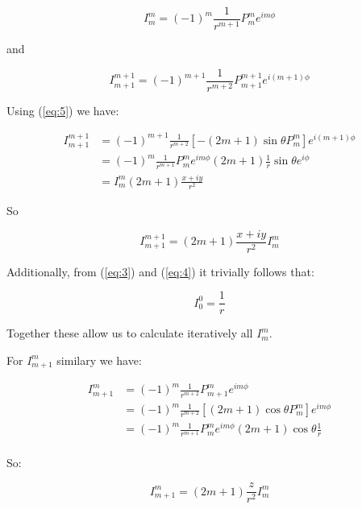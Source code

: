 \documentclass{article}
\begin{document}
\begin{equation}
  I^{m}_{m} = (-1)^{m} \frac{1}{r^{m+1}} P^m_m e^{i m \phi}
\end{equation}

and

\begin{equation}
  I^{m+1}_{m+1} = (-1)^{m+1} \frac{1}{r^{m+2}} P^{m+1}_{m+1} e^{i (m+1) \phi}
\end{equation}

Using (\ref{eq:5}) we have:

\begin{equation}
  \begin{split}
    I^{m+1}_{m+1} & = (-1)^{m+1} \frac{1}{r^{m+2}} \left[  -(2m+1) \sin{\theta} P^m_m \right] e^{i (m+1) \phi}  \\
    & = (-1)^m \frac{1}{r^{m+1}} P^m_m e^{i m \phi} (2m+1) \frac{1}{r} \sin{\theta} e^{i\phi} \\
    & = I^m_m (2m+1) \frac{x+iy}{r^2}
  \end{split}
\end{equation}

So

\begin{equation} \label{eq:27}
  \boxed{I^{m+1}_{m+1} = (2m+1) \frac{x+iy}{r^2} I^m_m}
\end{equation}

Additionally, from (\ref{eq:3}) and (\ref{eq:4}) it trivially follows that:

\begin{equation} \label{eq:28}
  \boxed{I^0_0 = \frac{1}{r}}
\end{equation}

Together these allow us to calculate iteratively all $I^m_m$.

For $I^m_{m+1}$ similary we have:

\begin{equation}
  \begin{split}
    I^m_{m+1} & = (-1)^m \frac{1}{r^{m+2}} P^m_{m+1} e^{i m \phi} \\
    & = (-1)^m \frac{1}{r^{m+2}} \left[   (2m+1) \cos{\theta} P^m_m \right] e^{i m \phi} \\
    & = (-1)^m \frac{1}{r^{m+1}} P^m_m e^{i m \phi} (2m+1) \cos{\theta} \frac{1}{r}  \\
  \end{split}
\end{equation}

So:

\begin{equation} \label{eq:30}
  \boxed{I^m_{m+1} = (2m+1) \frac{z}{r^2} I^m_m}
\end{equation}
\end{document}
